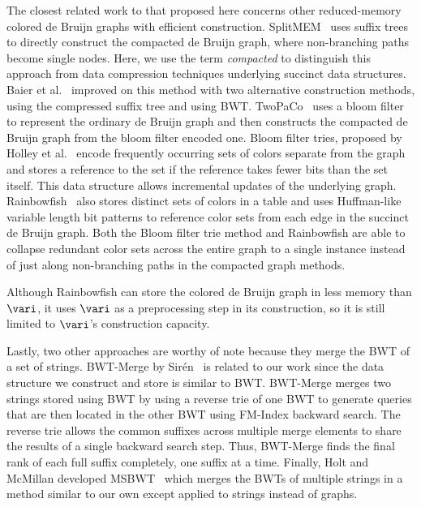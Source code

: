 The closest related work to that proposed here concerns other reduced-memory colored de Bruijn graphs with efficient construction. SplitMEM~\cite{splitmem} uses suffix trees to directly construct the compacted de Bruijn graph, where non-branching paths become single nodes.  Here, we use the term {\em compacted} to distinguish this approach from data compression techniques underlying succinct data structures.  Baier et al.~\cite{baier2015graphical} improved on this method with two alternative construction methods, using the compressed suffix tree and using BWT. TwoPaCo~\cite{minkin2016twopaco} uses a bloom filter to represent the ordinary de Bruijn graph and then constructs the compacted de Bruijn graph from the bloom filter encoded one.    Bloom filter tries, proposed by Holley  et al.~\cite{holley2015bloom} encode frequently occurring sets of colors separate from the graph and stores a reference to the set if the reference takes fewer bits than the set itself.   This data structure allows incremental updates of the underlying graph.  Rainbowfish~\cite{rainbowfish} also stores distinct sets of colors in a table and uses Huffman-like variable length bit patterns to reference color sets from each edge in the succinct de Bruijn graph.  Both the Bloom filter trie method and Rainbowfish are able to collapse redundant color sets across the entire graph to a single instance instead of just along non-branching paths in the compacted graph methods.  

Although Rainbowfish can store the colored de Bruijn graph in less memory than $\vari$, it uses  $\vari$ as a preprocessing step in its construction, so it is still limited to  $\vari$'s construction capacity. 

Lastly, two other approaches are worthy of note because they merge the BWT of a set of strings.  BWT-Merge by Sir{\'e}n~\cite{siren2016burrows} is related to our work since the data structure we construct and store is similar to BWT.  BWT-Merge merges two strings stored using BWT by using a reverse trie of one BWT to generate queries that are then located in the other BWT using FM-Index backward search.  The reverse trie allows the common suffixes across multiple merge elements to share the results of a single backward search step. Thus, BWT-Merge finds the final rank of each full suffix completely, one suffix at a time.   Finally, Holt and McMillan developed MSBWT~\cite{holt2014merging} which merges the BWTs of multiple strings in a method similar to our own except applied to strings instead of graphs.


